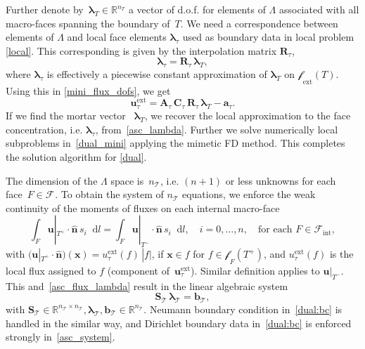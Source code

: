 \documentclass[12pt]{article}
\newcommand{\vect}[1]{\boldsymbol{\mathbf{#1}}}
\newcommand{\bcell}{T}
\newcommand{\bmesh}{{\vect{\mathcal T}}}
\newcommand{\mmesh}{{\vect{\mathcal \tau}}}
\newcommand{\bfaces}[1][]{{\vect{\mathcal F}_{\text{#1}}}}
\newcommand{\mfaces}[1][]{{\vect{\mathcal f}_{\text{#1}}}}
\newcommand{\Rn}[1]{{\mathbb R^{#1}}}
\newcommand*\diff{\mathop{}\!\mathrm{d}}
\begin{document}
	Further denote by~${{\vect \lambda}_\bcell \in \Rn{n_\bcell}}$ a vector of d.o.f. for elements of $\Lambda$ associated with all macro-faces spanning the boundary of~$\bcell$. We need a correspondence between elements of $\Lambda$ and local face elements $\vect \lambda_\mmesh$ used as boundary data in local problem \eqref{local}.
	This corresponding is given by the interpolation matrix $ \vect R_\mmesh$,
	\begin{equation}\label{asc_lambda}
		{\vect \lambda}_\mmesh = \vect R_\mmesh\,{\vect \lambda}_\bcell,
	\end{equation}
	where ${\vect \lambda}_\mmesh$ is effectively a piecewise constant approximation of ${\vect \lambda}_\bcell$ on $\mfaces_{\text{ext}}(T)$.
	Using this in \eqref{mini_flux_dofs}, we get
	\begin{equation}\label{asc_flux_lambda}
		{\vect u}^\text{ext}_\mmesh = \vect A_\mmesh\,\vect C_\mmesh\,\vect R_\mmesh\,{\vect \lambda}_\bcell - {\vect a}_\mmesh.
	\end{equation}
	If we find the mortar vector ~${\vect \lambda}_\bcell$, we recover the local approximation to the face concentration, i.e. ${\vect \lambda}_\mmesh$, from~\eqref{asc_lambda}.
	Further we solve numerically local subproblems in~\eqref{dual_mini} applying the mimetic FD method. This completes the solution algorithm for \eqref{dual}.
	
	The dimension of the $\Lambda$ space is~$n_\bmesh$, i.e. $(n+1)$ or less unknowns for each face~${F \in \bfaces}$.
	To obtain the system of $n_\bmesh$ equations, we enforce the weak continuity of the moments of  fluxes  on each internal macro-face
	\begin{equation}\label{flux_cont}
		\int_F \vect u|_{\bcell^+}\cdot\hat{\vect n}\,s_i \diff l = \int_F \vect u|_{\bcell^-}\cdot\hat{\vect n}\,s_i \diff l, \quad i = 0, \dots, n, \quad \text{for each } F \in \bfaces[int],
	\end{equation}
	with $\big(\vect u|_{\bcell^+}\cdot\hat{\vect n}\big)(\vect x) = u^\text{ext}_\mmesh(f)\,|f|$, if $\vect x \in f$ for $f\in\mfaces_F(T^+)$, and $u^\text{ext}_\mmesh(f)$ is the local flux assigned to $f$ (component of~$\vect u^\text{ext}_\mmesh$). Similar definition applies to $\vect u|_{\bcell^-}$. 	
	This and~\eqref{asc_flux_lambda} result in the linear algebraic system
	\begin{equation}\label{asc_system}
		\vect S_\bmesh\,{\vect \lambda}_\bmesh = {\vect b}_\bmesh,
	\end{equation}
	with	$\vect S_\bmesh \in \Rn{n_\bmesh \times n_\bmesh}, {\vect \lambda}_\bmesh, {\vect b}_\bmesh \in \Rn{n_\bmesh}$.
	Neumann boundary condition in~\eqref{dual:bc} is handled in the similar way, and Dirichlet boundary data in~\eqref{dual:bc} is enforced strongly in~\eqref{asc_system}.
	
\end{document}
